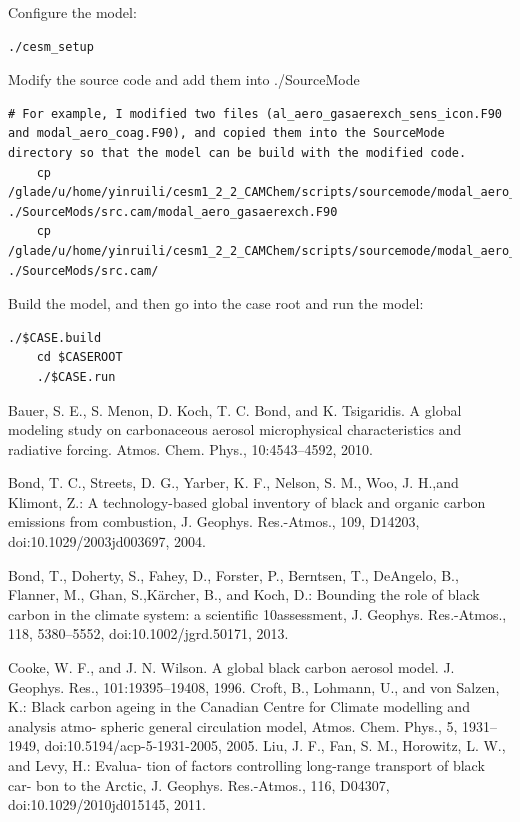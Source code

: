 \documentclass[12pt]{article}
\begin{document}
	Configure the model:
	\begin{lstlisting}[xleftmargin=0.01\textwidth, xrightmargin=0.01\textwidth]
	./cesm_setup
	\end{lstlisting}
	
	Modify the source code and add them into ./SourceMode
	\begin{lstlisting}[xleftmargin=0.01\textwidth, xrightmargin=0.01\textwidth]
	# For example, I modified two files (al_aero_gasaerexch_sens_icon.F90 and modal_aero_coag.F90), and copied them into the SourceMode directory so that the model can be build with the modified code. 
	cp /glade/u/home/yinruili/cesm1_2_2_CAMChem/scripts/sourcemode/modal_aero_gasaerexch.F90 ./SourceMods/src.cam/modal_aero_gasaerexch.F90
	cp /glade/u/home/yinruili/cesm1_2_2_CAMChem/scripts/sourcemode/modal_aero_coag.F90 ./SourceMods/src.cam/

	\end{lstlisting}
	
	Build the model, and then go into the case root and run the model:
	\begin{lstlisting}[xleftmargin=0.01\textwidth, xrightmargin=0.01\textwidth]
	./$CASE.build
	cd $CASEROOT
	./$CASE.run
	\end{lstlisting}
	
	
	
	
	
	
	
	
	
	
	


Bauer, S. E.,  S. Menon, D. Koch, T. C. Bond, and K. Tsigaridis. A global modeling study on carbonaceous aerosol microphysical characteristics and radiative forcing. Atmos. Chem. Phys., 10:4543–4592, 2010.

Bond, T. C., Streets, D. G., Yarber, K. F., Nelson, S. M., Woo, J. H.,and Klimont, Z.: A technology-based global inventory of black and organic carbon emissions from combustion, J. Geophys. Res.-Atmos., 109, D14203, doi:10.1029/2003jd003697, 2004.

Bond, T., Doherty, S., Fahey, D., Forster, P., Berntsen, T., DeAngelo, B., Flanner, M., Ghan, S.,Kärcher, B., and Koch, D.: Bounding the role of black carbon in the climate system: a scientific 10assessment, J. Geophys. Res.-Atmos., 118, 5380–5552, doi:10.1002/jgrd.50171, 2013.

Cooke, W. F., and J. N. Wilson. A global black carbon aerosol model. J. Geophys. Res., 101:19395–19408, 1996.
Croft, B., Lohmann, U., and von Salzen, K.: Black carbon ageing in the Canadian Centre for Climate modelling and analysis atmo- spheric general circulation model, Atmos. Chem. Phys., 5, 1931– 1949, doi:10.5194/acp-5-1931-2005, 2005. 
Liu, J. F., Fan, S. M., Horowitz, L. W., and Levy, H.: Evalua- tion of factors controlling long-range transport of black car- bon to the Arctic, J. Geophys. Res.-Atmos., 116, D04307, doi:10.1029/2010jd015145, 2011. 
\end{document}
